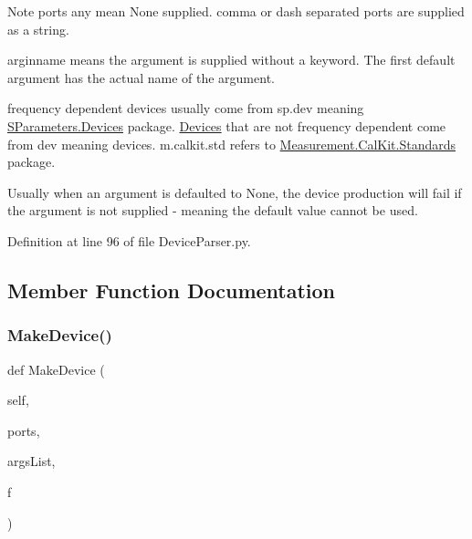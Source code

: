\begin{DoxyNote}{Note}
ports any mean None supplied. comma or dash separated ports are supplied as a string. 

arginname means the argument is supplied without a keyword. The first default argument has the actual name of the argument. 

frequency dependent devices usually come from \textquotesingle{}sp.\+dev\textquotesingle{} meaning \hyperlink{namespaceSignalIntegrity_1_1SParameters_1_1Devices}{S\+Parameters.\+Devices} package. \hyperlink{namespaceSignalIntegrity_1_1Parsers_1_1Devices}{Devices} that are not frequency dependent come from \textquotesingle{}dev\textquotesingle{} meaning devices. \textquotesingle{}m.\+calkit.\+std\textquotesingle{} refers to \textquotesingle{}\hyperlink{namespaceSignalIntegrity_1_1Measurement_1_1CalKit_1_1Standards}{Measurement.\+Cal\+Kit.\+Standards}\textquotesingle{} package. 

Usually when an argument is defaulted to None, the device production will fail if the argument is not supplied -\/ meaning the default value cannot be used. 
\end{DoxyNote}


Definition at line 96 of file Device\+Parser.\+py.



\subsection{Member Function Documentation}
\mbox{\label{classSignalIntegrity_1_1Parsers_1_1Devices_1_1DeviceParser_1_1DeviceFactory_a84bd6828768b3a1677c71d39f3cb91dd}} 
\subsubsection{\texorpdfstring{Make\+Device()}{MakeDevice()}}
{\footnotesize\ttfamily def Make\+Device (\begin{DoxyParamCaption}\item[{}]{self,  }\item[{}]{ports,  }\item[{}]{args\+List,  }\item[{}]{f }\end{DoxyParamCaption})}



